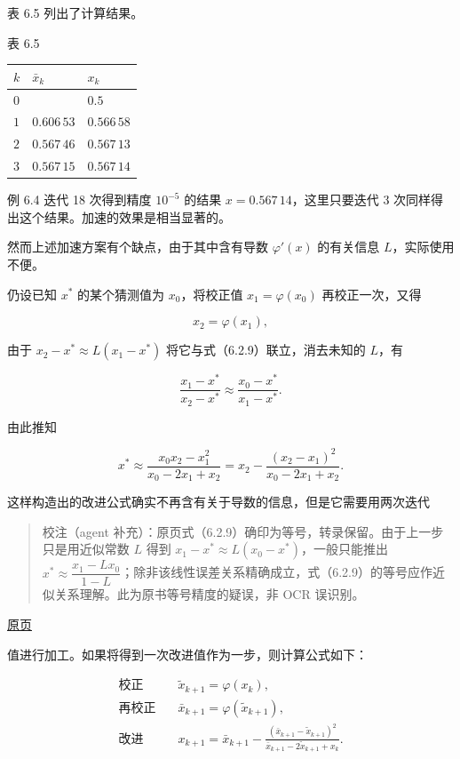 \documentclass[
  10pt,
  fontset=fandol]{ctexart}
\newcounter{none} %
\begin{document}
表 6.5 列出了计算结果。

表 6.5

{\def\LTcaptype{none} %
\begin{longtable}[]{@{}lll@{}}
\toprule\noalign{}
\(k\) & \(\bar{x}_k\) & \(x_k\) \\
\midrule\noalign{}
\endhead
\bottomrule\noalign{}
\endlastfoot
\(0\) & & \(0.5\) \\
\(1\) & \(0.606\,53\) & \(0.566\,58\) \\
\(2\) & \(0.567\,46\) & \(0.567\,13\) \\
\(3\) & \(0.567\,15\) & \(0.567\,14\) \\
\end{longtable}
}

例 6.4 迭代 18 次得到精度 \(10^{-5}\) 的结果 \(x=0.567\,14\)，这里只要迭代 3 次同样得出这个结果。加速的效果是相当显著的。

然而上述加速方案有个缺点，由于其中含有导数 \(\varphi'(x)\) 的有关信息 \(L\)，实际使用不便。

仍设已知 \(x^*\) 的某个猜测值为 \(x_0\)，将校正值 \(x_1=\varphi(x_0)\) 再校正一次，又得

\[
x_2=\varphi(x_1),
\]

由于 \(x_2-x^*\approx L(x_1-x^*)\) 将它与式（6.2.9）联立，消去未知的 \(L\)，有

\[
\frac{x_1-x^*}{x_2-x^*}\approx\frac{x_0-x^*}{x_1-x^*}.
\]

由此推知

\[
x^*\approx\frac{x_0x_2-x_1^2}{x_0-2x_1+x_2}=x_2-\frac{(x_2-x_1)^2}{x_0-2x_1+x_2}.
\]

这样构造出的改进公式确实不再含有关于导数的信息，但是它需要用两次迭代

\begin{quote}
校注（agent 补充）：原页式（6.2.9）确印为等号，转录保留。由于上一步只是用近似常数 \(L\) 得到 \(x_1-x^*\approx L(x_0-x^*)\)，一般只能推出 \(x^*\approx\dfrac{x_1-Lx_0}{1-L}\)；除非该线性误差关系精确成立，式（6.2.9）的等号应作近似关系理解。此为原书等号精度的疑误，非 OCR 误识别。
\end{quote}

\href{../../source-images/pdf-162.jpeg}{原页}

值进行加工。如果将得到一次改进值作为一步，则计算公式如下：

\[
\begin{aligned}
\text{校正}\quad&\tilde{x}_{k+1}=\varphi(x_k),\\
\text{再校正}\quad&\bar{x}_{k+1}=\varphi(\tilde{x}_{k+1}),\\
\text{改进}\quad&x_{k+1}=\bar{x}_{k+1}-\frac{(\bar{x}_{k+1}-\tilde{x}_{k+1})^2}{\bar{x}_{k+1}-2\tilde{x}_{k+1}+x_k}.
\end{aligned}
\tag{6.2.11}
\]
\end{document}
